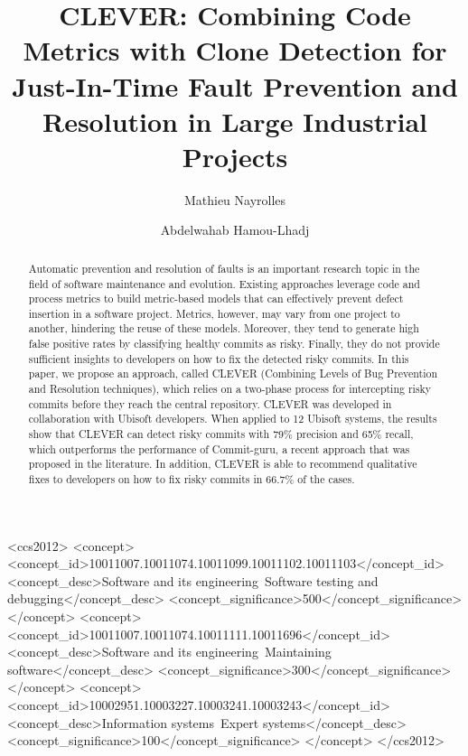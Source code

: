 \documentclass[sigconf]{acmart}
\begin{document}
\title{CLEVER: Combining Code Metrics with Clone Detection for Just-In-Time
Fault Prevention and Resolution in Large Industrial Projects\vspace{0.5cm}}

\author{Mathieu Nayrolles}
\author{Abdelwahab Hamou-Lhadj}

\renewcommand{\shorttitle}{Combining Code Metrics With Clone Detection For Faults Prevention and Resolution}

\begin{abstract}
Automatic prevention and resolution of faults is an important research
topic in the field of software maintenance and evolution. Existing
approaches leverage code and process metrics to build metric-based
models that can effectively prevent defect insertion in a software
project. Metrics, however, may vary from one project to another,
hindering the reuse of these models. Moreover, they tend to generate
high false positive rates by classifying healthy commits as risky.
Finally, they do not provide sufficient insights to developers on how to
fix the detected risky commits. In this paper, we propose an approach,
called CLEVER (Combining Levels of Bug Prevention and Resolution
techniques), which relies on a two-phase process for intercepting risky
commits before they reach the central repository. CLEVER was developed
in collaboration with Ubisoft developers. When applied to 12 Ubisoft
systems, the results show that CLEVER can detect risky commits with 79\%
precision and 65\% recall, which outperforms the performance of
Commit-guru, a recent approach that was proposed in the literature. In
addition, CLEVER is able to recommend qualitative fixes to developers on
how to fix risky commits in 66.7\% of the cases.
\end{abstract}

%
%
\begin{CCSXML}
<ccs2012>
<concept>
<concept_id>10011007.10011074.10011099.10011102.10011103</concept_id>
<concept_desc>Software and its engineering~Software testing and debugging</concept_desc>
<concept_significance>500</concept_significance>
</concept>
<concept>
<concept_id>10011007.10011074.10011111.10011696</concept_id>
<concept_desc>Software and its engineering~Maintaining software</concept_desc>
<concept_significance>300</concept_significance>
</concept>
<concept>
<concept_id>10002951.10003227.10003241.10003243</concept_id>
<concept_desc>Information systems~Expert systems</concept_desc>
<concept_significance>100</concept_significance>
</concept>
</ccs2012>
\end{CCSXML}
\end{document}
